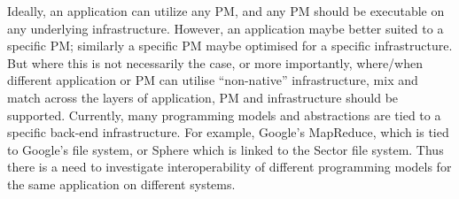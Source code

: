 \documentclass[graybox]{svmult}
\begin{document}
Ideally, an application can utilize any PM, and any PM should be
executable on any underlying infrastructure. However, an application
maybe better suited to a specific PM; similarly a specific PM maybe
optimised for a specific infrastructure. But where this is not
necessarily the case, or more importantly, where/when different
application or PM can utilise ``non-native'' infrastructure, mix and
match across the layers of application, PM and infrastructure should
be supported.  Currently, many programming models and abstractions are
tied to a specific back-end infrastructure.  For example, Google's
MapReduce, which is tied to Google's file system, or
Sphere\cite{sectorsphere09} which is linked to the Sector file
system. Thus there is a need to investigate interoperability of
different programming models for the same application on different
systems.



 



\end{document}
